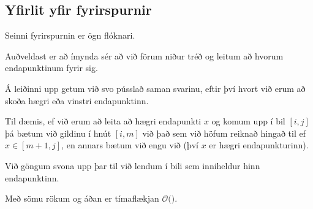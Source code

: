 \subsection{Yfirlit yfir fyrirspurnir}
{
    {
        \item<1-> Seinni fyrirspurnin er ögn flóknari.
        \item<2-> Auðveldast er að ímynda sér að við förum niður tréð og leitum að hvorum endapunktinum fyrir sig.
        \item<3-> Á leiðinni upp getum við svo pússlað saman svarinu, eftir því hvort við erum að skoða hægri eða vinstri endapunktinn.
        \item<4-> Til dæmis, ef við erum að leita að hægri endapunkti $x$ og komum upp í bil $[i, j]$ þá bætum við gildinu í hnút
            $[i, m]$ við það sem við höfum reiknað hingað til ef $x \in [m + 1, j]$, en annars bætum við engu við (því $x$ er hægri endapunkturinn).
        \item<5-> Við göngum svona upp þar til við lendum í bili sem inniheldur hinn endapunktinn.
        \item<6-> Með sömu rökum og áðan er tímaflækjan $\mathcal{O}($$)$.
    }
}

